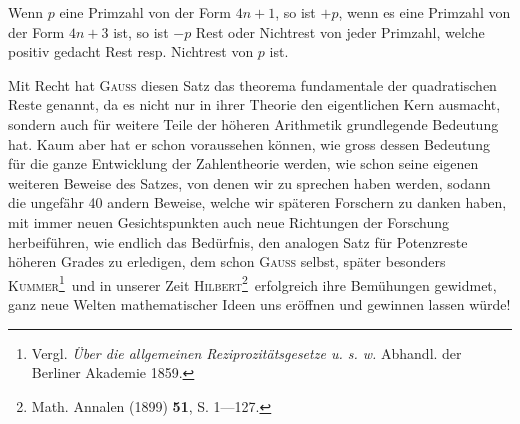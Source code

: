 Wenn \(p\) eine Primzahl von der Form \(4n+1\), so ist \(+p\), wenn es eine Primzahl von der Form \(4n+3\) ist, so ist \(-p\) Rest oder Nichtrest von jeder Primzahl, welche positiv gedacht Rest resp. Nichtrest von \(p\) ist.

Mit Recht hat \textsc{Gauss} diesen Satz das theorema fundamentale der quadratischen Reste genannt, da es nicht nur in ihrer Theorie den eigentlichen Kern ausmacht, sondern auch für weitere Teile der höheren Arithmetik grundlegende Bedeutung hat. Kaum aber hat er schon voraussehen können, wie gross dessen Bedeutung für die ganze Entwicklung der Zahlentheorie werden, wie schon seine eigenen weiteren Beweise des Satzes, von denen wir zu sprechen haben werden, sodann die ungefähr 40 andern Beweise, welche wir späteren Forschern zu danken haben, mit immer neuen Gesichtspunkten auch neue Richtungen der Forschung herbeiführen, wie endlich das Bedürfnis, den analogen Satz für Potenzreste höheren Grades zu erledigen, dem schon \textsc{Gauss} selbst, später besonders \textsc{Kummer}\begingroup\renewcommand{\thefootnote}{†)}\footnote{Vergl. \textit{Über die allgemeinen Reziprozitätsgesetze u. s. w.} Abhandl. der Berliner Akademie 1859.}\endgroup\ und in unserer Zeit \textsc{Hilbert}\begingroup\renewcommand{\thefootnote}{††)}\footnote{Math. Annalen (1899) \textbf{51}, S. 1—127.}\endgroup\ erfolgreich ihre Bemühungen gewidmet, ganz neue Welten mathematischer Ideen uns eröffnen und gewinnen lassen würde!
